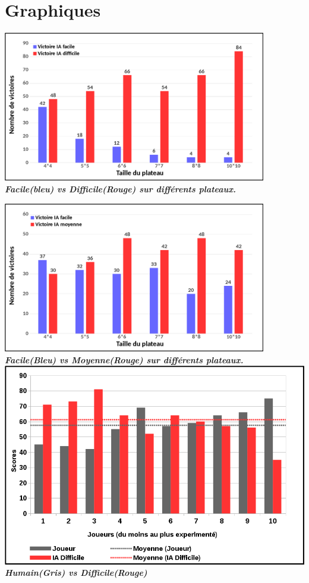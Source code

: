 \documentclass{report}
\begin{document}
\section{Graphiques}
\begin{center}
  \includegraphics[width=11.5cm]{image/IA10.png}
  \newline
\textbf{\textit{Facile(bleu) vs Difficile(Rouge) sur différents plateaux.}}
  \newline
  
  \includegraphics[width=11.5cm]{image/IA11.png}
  \newline
\textbf{\textit{Facile(Bleu) vs Moyenne(Rouge) sur différents plateaux.}}
  \includegraphics[width=18cm]{image/IA12.png}
  \newline
\textbf{\textit{Humain(Gris) vs Difficile(Rouge)}}
\end{center}
\end{document}
